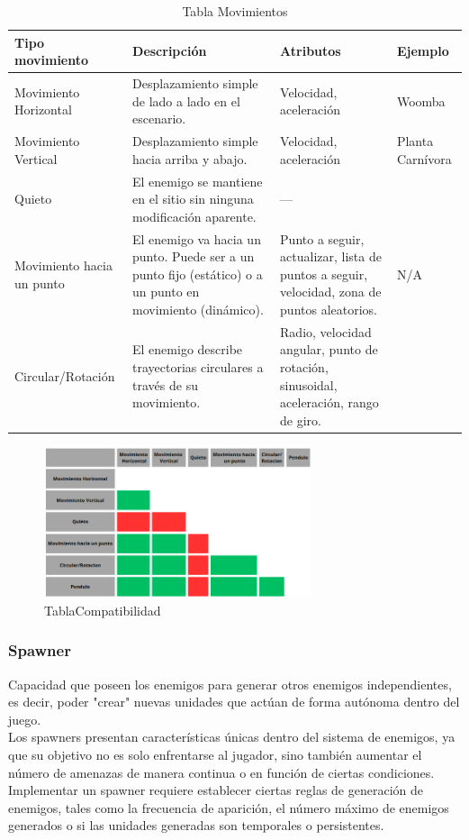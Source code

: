 \begin{table}
	\centering
	\begin{tabular}{|p{3cm}|p{4.5cm}|p{4cm}|p{3cm}|}
	\hline
	\textbf{Tipo movimiento} & \textbf{Descripción} & \textbf{Atributos} & \textbf{Ejemplo} \\ 
	\hline
	Movimiento Horizontal & Desplazamiento simple de lado a lado en el escenario. & Velocidad, aceleración & Woomba \\ 
	\hline
	Movimiento Vertical & Desplazamiento simple hacia arriba y abajo. & Velocidad, aceleración & Planta Carnívora \\ 
	\hline
	Quieto & El enemigo se mantiene en el sitio sin ninguna modificación aparente. & —  \\ 
	\hline
	Movimiento hacia un punto & El enemigo va hacia un punto. Puede ser a un punto fijo (estático) o a un punto en movimiento (dinámico). & Punto a seguir, actualizar, lista de puntos a seguir, velocidad, zona de puntos aleatorios. & N/A \\ 
	\hline
	Circular/Rotación & El enemigo describe trayectorias circulares a través de su movimiento. & Radio, velocidad angular, punto de rotación, sinusoidal, aceleración, rango de giro.  \\ 
	\hline
	\end{tabular}
	\caption{Tabla Movimientos}
	\label{tab:movimientos}
\end{table}

\begin{figure}[h]
	\centering
	\includegraphics[width = 0.7\textwidth]{Imagenes/TablaCompatibilidad.png}
	\caption{TablaCompatibilidad }
	\label{fig:TablaCompatibilidad}
\end{figure}
\subsubsection{Spawner}
Capacidad que poseen los enemigos para generar otros enemigos independientes, es decir, poder "crear" nuevas unidades que actúan de forma autónoma dentro del juego.\\
Los spawners presentan características únicas dentro del sistema de enemigos, ya que su objetivo no es solo enfrentarse al jugador, sino también aumentar el número de amenazas de manera continua o en función de ciertas condiciones.
Implementar un spawner requiere establecer ciertas reglas de generación de enemigos, tales como la frecuencia de aparición, el número máximo de enemigos generados o si las unidades generadas son temporales o persistentes.
